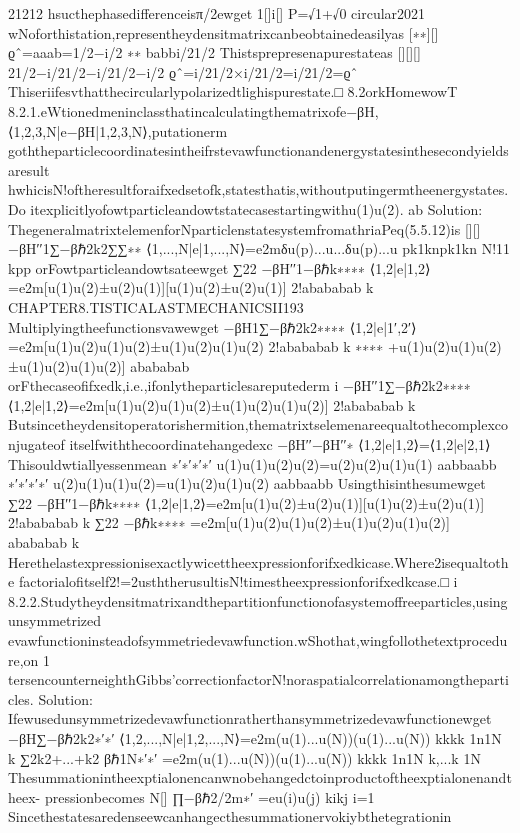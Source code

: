 {{{{{{{{{{21212
hsucthephasedifferenceisπ/2ewget
1[]i[]
P=√1+√0
circular2021
wNoforthistation,representheydensitmatrixcanbeobtainedeasilyas
[∗∗][]
ϱˆ=aaab=1/2−i/2
∗∗
babbi/21/2
Thistsprepresenapurestateas
[][][]
21/2−i/21/2−i/21/2−i/2
ϱˆ=i/21/2×i/21/2=i/21/2=ϱˆ
Thiseriifesvthatthecircularlypolarizedtlighispurestate.□
8.2orkHomewowT
8.2.1.eWtionedmeninclassthatincalculatingthematrixofe−βH,⟨1,2,3,N|e−βH|1,2,3,N⟩,putationerm
goththeparticlecoordinatesintheifrstevawfunctionandenergystatesinthesecondyieldsaresult
hwhicisN!oftheresultforaifxedsetof{k,}statesthatis,withoutputingermtheenergystates.Do
itexplicitlyofowtparticleandowtstatecasestartingwithu(1)u(2).
ab
Solution:
ThegeneralmatrixtelemenforNparticlenstatesystemfromathriaPeq(5.5.12)is
[][]
−βH′′1∑−βℏ2k2∑∑{∗∗}
⟨1,...,N|e|1,...,N⟩=e2mδ{u(p)...u}...δu(p)...u
pk1knpk1kn
N!11
kpp
orFowtparticleandowtsateewget
∑22
−βH′′1−βℏk∗∗∗∗
⟨1,2|e|1,2⟩=e2m[u(1)u(2)±u(2)u(1)][u(1)u(2)±u(2)u(1)]
2!abababab
k
CHAPTER8.TISTICALASTMECHANICSII193
Multiplyingtheefunctionsvawewget
−βH1∑−βℏ2k2∗∗∗∗
⟨1,2|e|1′,2′⟩=e2m[u(1)u(2)u(1)u(2)±u(1)u(2)u(1)u(2)
2!abababab
k
∗∗∗∗
+u(1)u(2)u(1)u(2)±u(1)u(2)u(1)u(2)]
abababab
orFthecaseofifxed{k},i.e.,ifonlytheparticlesareputederm
i
−βH′′1∑−βℏ2k2∗∗∗∗
⟨1,2|e|1,2⟩=e2m[u(1)u(2)u(1)u(2)±u(1)u(2)u(1)u(2)]
2!abababab
k
Butsincetheydensitoperatorishermition,thematrixtselemenareequaltothecomplexconjugateof
itselfwiththecoordinatehangedexc
−βH′′−βH′′∗
⟨1,2|e|1,2⟩=⟨1,2|e|2,1⟩
Thisouldwtiallyessenmean
∗′∗′∗′∗′
u(1)u(1)u(2)u(2)=u(2)u(2)u(1)u(1)
aabbaabb
∗′∗′∗′∗′
u(2)u(1)u(1)u(2)=u(1)u(2)u(1)u(2)
aabbaabb
Usingthisinthesumewget
∑22
−βH′′1−βℏk∗∗∗∗
⟨1,2|e|1,2⟩=e2m[u(1)u(2)±u(2)u(1)][u(1)u(2)±u(2)u(1)]
2!abababab
k
∑22
−βℏk∗∗∗∗
=e2m[u(1)u(2)u(1)u(2)±u(1)u(2)u(1)u(2)]
abababab
k
Herethelastexpressionisexactlywicettheexpressionforifxed{ki}case.Where2isequaltothe
factorialofitself2!=2usththerusultisN!timestheexpressionforifxed{k}case.□
i
8.2.2.Studytheydensitmatrixandthepartitionfunctionofasystemoffreeparticles,usingunsymmetrized
evawfunctioninsteadofsymmetriedevawfunction.wShothat,wingfollothetextprocedure,on
1
tersencounterneighthGibbs’correctionfactorN!noraspatialcorrelationamongtheparticles.
Solution:
Ifewusedunsymmetrizedevawfunctionratherthansymmetrizedevawfunctionewget
−βH∑−βℏ2k2∗′∗′
⟨1,2,...,N|e|1,2,...,N⟩=e2m(u(1)...u(N))(u(1)...u(N))
kkkk
1n1N
k
∑2k2+...+k2
βℏ1N∗′∗′
=e2m(u(1)...u(N))(u(1)...u(N))
kkkk
1n1N
k,...k
1N
Thesummationintheexptialonencanwnobehangedctoinproductoftheexptialonenandtheex-
pressionbecomes
N[{}]
∏−βℏ2/2m∗′
=eu(i)u(j)
kikj
i=1
Sincethestatesaredenseewcanhangecthesummationervokiybthetegrationin
}}}}}}}}}}
